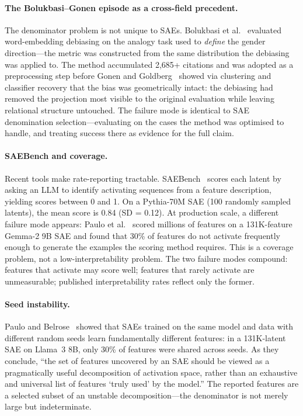 \documentclass{article}
\begin{document}
\paragraph{The Bolukbasi--Gonen episode as a cross-field precedent.} The denominator problem is not unique to SAEs. Bolukbasi et al.~\citep{bolukbasi_man_2016} evaluated word-embedding debiasing on the analogy task used to \textit{define} the gender direction---the metric was constructed from the same distribution the debiasing was applied to. The method accumulated 2,685+ citations and was adopted as a preprocessing step before Gonen and Goldberg~\citep{gonen_lipstick_2019} showed via clustering and classifier recovery that the bias was geometrically intact: the debiasing had removed the projection most visible to the original evaluation while leaving relational structure untouched. The failure mode is identical to SAE denomination selection---evaluating on the cases the method was optimised to handle, and treating success there as evidence for the full claim.

\paragraph{SAEBench and coverage.} Recent tools make rate-reporting tractable. SAEBench~\citep{karvonen_saebench_2025} scores each latent by asking an LLM to identify activating sequences from a feature description, yielding scores between 0 and 1. On a Pythia-70M SAE (100 randomly sampled latents), the mean score is 0.84 (SD = 0.12). At production scale, a different failure mode appears: Paulo et al.~\citep{paulo_autointerp_2024} scored millions of features on a 131K-feature Gemma-2 9B SAE and found that 30\% of features do not activate frequently enough to generate the examples the scoring method requires. This is a coverage problem, not a low-interpretability problem. The two failure modes compound: features that activate may score well; features that rarely activate are unmeasurable; published interpretability rates reflect only the former.

\paragraph{Seed instability.} Paulo and Belrose~\citep{paulo_belrose_seeds_2026} showed that SAEs trained on the same model and data with different random seeds learn fundamentally different features: in a 131K-latent SAE on Llama~3 8B, only 30\% of features were shared across seeds. As they conclude, ``the set of features uncovered by an SAE should be viewed as a pragmatically useful decomposition of activation space, rather than an exhaustive and universal list of features `truly used' by the model.'' The reported features are a selected subset of an unstable decomposition---the denominator is not merely large but indeterminate.
\end{document}
